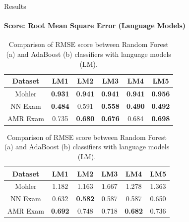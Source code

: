 \documentclass[aspectratio=169]{beamer}
\begin{document}
\begin{frame}{Results}
\framesubtitle{Score: Root Mean Square Error (Language Models)}
\begin{table}
\begin{subtable}[c]{0.5\textwidth}
	\centering
	\begin{tabular}{|c|c|c|c|c|c|}
		\hline
		Dataset & LM1 & LM2 & LM3 & LM4 & LM5 \\
		\hline
		Mohler \cite{} &\textbf{0.931}& \textbf{0.941}& \textbf{0.941}& \textbf{0.941}& \textbf{0.956}\\
		\hline
		NN Exam \cite{} &\textbf{0.484}& {0.591}& \textbf{0.558}& \textbf{0.490}& \textbf{0.492}\\
		\hline
		AMR Exam \cite{} &0.735& \textbf{0.680}& \textbf{0.676}& 0.684& \textbf{0.698}\\
		\hline
	\end{tabular}
	\subcaption{}
\end{subtable}
\begin{subtable}[c]{0.5\textwidth}
	\centering
	\begin{tabular}{|c|c|c|c|c|c|}
		\hline
		Dataset & LM1 & LM2 & LM3 & LM4 & LM5 \\
		\hline
		Mohler \cite{} &1.182& 1.163& 1.667& 1.278& 1.363 \\
		\hline
		NN Exam \cite{} &0.632& \textbf{0.582}& 0.587& 0.587& 0.650\\
		\hline
		AMR Exam \cite{} &\textbf{0.692}& 0.748& 0.718& \textbf{0.682}& 0.736\\
		\hline
	\end{tabular}	
	\subcaption{}
\end{subtable}
\caption{Comparison of RMSE score between Random Forest (a) and AdaBoost (b) classifiers with language models (LM).}
\end{table}
\end{frame}
\end{document}
